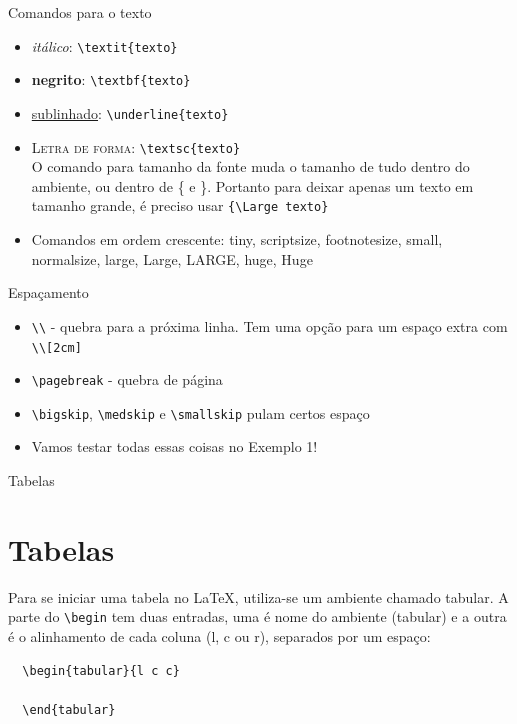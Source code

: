 \documentclass[12pt]{beamer}
\begin{document}
\begin{frame}[fragile]{Comandos para o texto}
  \begin{itemize}
    \item \textit{itálico}: \verb+\textit{texto}+
    \item \textbf{negrito}: \verb+\textbf{texto}+
    \item \underline{sublinhado}: \verb+\underline{texto}+
    \item \textsc{Letra de forma}: \verb+\textsc{texto}+
    \\[.5cm]
    O comando para tamanho da fonte muda o tamanho de tudo dentro do ambiente, ou dentro de \{ e \}. Portanto para deixar apenas um texto em tamanho grande, é preciso usar \verb+{\Large texto}+
    \item Comandos em ordem crescente: tiny, scriptsize, footnotesize, small, normalsize, large, Large, LARGE, huge, Huge
  \end{itemize}
\end{frame}

\begin{frame}[fragile]{Espaçamento}

\begin{itemize}
  \item \verb+\\+ - quebra para a próxima linha. Tem uma opção para um espaço extra com \verb+\\[2cm]+
  \item \verb+\pagebreak+ - quebra de página
  \item \verb+\bigskip+, \verb+\medskip+ e \verb+\smallskip+ pulam certos espaço
  \item Vamos testar todas essas coisas no Exemplo 1!
\end{itemize}

\end{frame}

\begin{frame}[fragile]{Tabelas}
  \section{Tabelas}
  Para se iniciar uma tabela no \LaTeX, utiliza-se um ambiente chamado tabular. A parte do \verb+\begin+ tem duas entradas, uma é nome do ambiente (tabular) e a outra é o alinhamento de cada coluna (l, c ou r), separados por um espaço:
  \begin{verbatim}
  \begin{tabular}{l c c}

  \end{tabular}
  \end{verbatim}
\end{frame}
\end{document}
